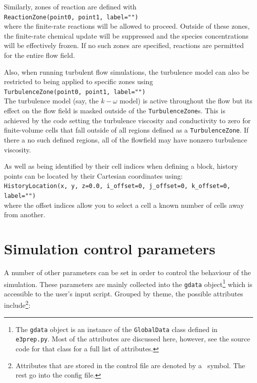 \documentclass[12pt,a4paper,twoside]{article}
\begin{document}
\medskip
Similarly, zones of reaction are defined with\\
\texttt{ReactionZone(point0, point1, label="")}\\
where the finite-rate reactions will be allowed to proceed.
Outside of these zones, the finite-rate chemical update will be suppressed 
and the species concentrations will be effectively frozen.
If no such zones are specified, reactions are permitted for the entire flow field.

\medskip
Also, when running turbulent flow simulations, the turbulence model can also be
restricted to being applied to specific zones using\\
\texttt{TurbulenceZone(point0, point1, label="")}\\
The turbulence model (say, the $k-\omega$ model) is active throughout the flow
but its effect on the flow field is masked outside of the \texttt{TurbulenceZone}s.
This is achieved by the code setting the turbulence viscosity and conductivity to zero
for finite-volume cells that fall outside of all regions defined as a \texttt{TurbulenceZone}.
If there a no such defined regions, all of the flowfield may have nonzero turbulence viscosity.

\medskip
As well as being identified by their cell indices when defining a block,
history points can be located by their Cartesian coordinates using:\\
\texttt{HistoryLocation(x, y, z=0.0, i\_offset=0, j\_offset=0, k\_offset=0, label="")} \\
where the offset indices allow you to select a cell a known number of cells 
away from another.

\bigskip
\section{Simulation control parameters}
\label{sec:sim-control-parameters}
%
A number of other parameters can be set in order to control the behaviour of
the simulation.
These parameters are mainly collected into the \texttt{gdata}
object\footnote{The \texttt{gdata} object is an instance of the \texttt{GlobalData}
  class defined in \texttt{e3prep.py}. Most of the attributes are discussed here,
  however, see the source code for that class for a full list of attributes.} 
which is accessible to the user's input script.
Grouped by theme, the possible attributes include\footnote{Attributes that are stored in the control file
are denoted by a \ddag ~symbol.  The rest go into the config file.}:
\end{document}
